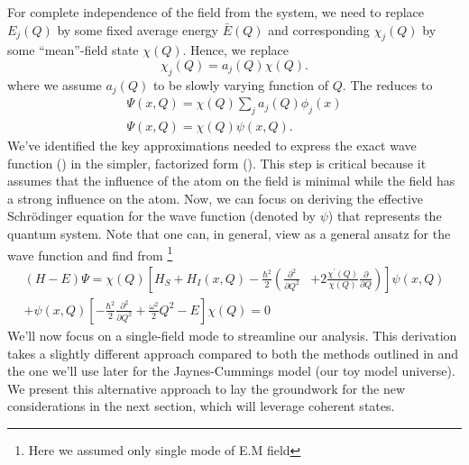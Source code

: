 For complete independence of the field from the system, we need to replace 
\(E_j(Q)\) by some fixed average energy \(\bar{E}(Q)\) and corresponding 
\(\chi_j(Q)\) by some ``mean''-field state \({\chi}(Q)\). Hence, we replace 
\begin{equation}
    \label{eq:class_jcm_eq8}
    \chi_j(Q) = a_j(Q) \chi(Q).
\end{equation}
where we assume \(a_j(Q)\) to be slowly varying function of \(Q\). The 
reduces to
\begin{align}
    \label{eq:class_jcm_eq9}
    \Psi(x, Q) = \chi(Q) \sum_j a_j(Q) \phi_j(x) \nonumber \\
    \Psi(x, Q) =  \chi(Q)  \psi(x, Q).
\end{align}
We've identified the key approximations needed to express the exact wave function 
() in the simpler, factorized form (). 
This step is critical because it assumes that the influence of the atom on the field is minimal while the
field has a strong influence on the atom. Now, we can focus on deriving the effective
Schrödinger equation for the wave function (denoted by \(\psi\)) that represents the quantum system.
Note that one can, in general, view  as a general ansatz for the wave function
and find from \footnote{Here we assumed only single mode of E.M field} 
\begin{align}
    \label{eq:class_jcm_eqA}
    (H - E) \Psi = \chi(Q)\left[H_S+H_I(x, Q)-\frac{\hbar^2}{2}\left(\frac{\partial^2}{\partial Q^2}\right.\right.
    & \left.\left. 
    +2 \frac{\chi^{\prime}(Q)}{\chi(Q)} \frac{\partial}{\partial Q}\right)\right] 
    \psi(x, Q) \nonumber \\
    +\psi(x, Q)\left[-\frac{\hbar^2}{2} \frac{\partial^2}{\partial Q^2}+\frac{\omega^2}{2} Q^2
    - E\right] \chi(Q) = 0
\end{align}
We'll now focus on a single-field mode to streamline our analysis. This derivation takes a 
slightly different approach compared to both the methods outlined in 
and the one we'll use later for the Jaynes-Cummings model (our toy model universe). 
We present this alternative approach to lay the groundwork for the new considerations 
in the next section, which will leverage coherent states.

